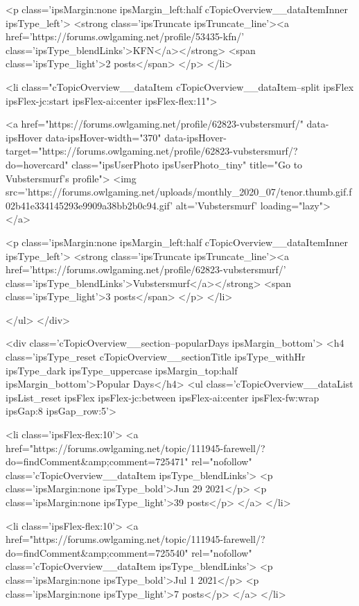 							<p class='ipsMargin:none ipsMargin_left:half cTopicOverview__dataItemInner ipsType_left'>
								<strong class='ipsTruncate ipsTruncate_line'><a href='https://forums.owlgaming.net/profile/53435-kfn/' class='ipsType_blendLinks'>KFN</a></strong>
								<span class='ipsType_light'>2 posts</span>
							</p>
						</li>
					
						<li class="cTopicOverview__dataItem cTopicOverview__dataItem--split ipsFlex ipsFlex-jc:start ipsFlex-ai:center ipsFlex-flex:11">
							


	<a href="https://forums.owlgaming.net/profile/62823-vubstersmurf/" data-ipsHover data-ipsHover-width="370" data-ipsHover-target="https://forums.owlgaming.net/profile/62823-vubstersmurf/?do=hovercard" class="ipsUserPhoto ipsUserPhoto_tiny" title="Go to Vubstersmurf's profile">
		<img src='https://forums.owlgaming.net/uploads/monthly_2020_07/tenor.thumb.gif.f02b41e334145293e9909a38bb2b0c94.gif' alt='Vubstersmurf' loading="lazy">
	</a>

							<p class='ipsMargin:none ipsMargin_left:half cTopicOverview__dataItemInner ipsType_left'>
								<strong class='ipsTruncate ipsTruncate_line'><a href='https://forums.owlgaming.net/profile/62823-vubstersmurf/' class='ipsType_blendLinks'>Vubstersmurf</a></strong>
								<span class='ipsType_light'>3 posts</span>
							</p>
						</li>
					
				</ul>
			</div>
		
		
			<div class='cTopicOverview__section--popularDays ipsMargin_bottom'>
				<h4 class='ipsType_reset cTopicOverview__sectionTitle ipsType_withHr ipsType_dark ipsType_uppercase ipsMargin_top:half ipsMargin_bottom'>Popular Days</h4>
				<ul class='cTopicOverview__dataList ipsList_reset ipsFlex ipsFlex-jc:between ipsFlex-ai:center ipsFlex-fw:wrap ipsGap:8 ipsGap_row:5'>
					
						<li class='ipsFlex-flex:10'>
							<a href="https://forums.owlgaming.net/topic/111945-farewell/?do=findComment&amp;comment=725471" rel="nofollow" class='cTopicOverview__dataItem ipsType_blendLinks'>
								<p class='ipsMargin:none ipsType_bold'>Jun 29 2021</p>
								<p class='ipsMargin:none ipsType_light'>39 posts</p>
							</a>
						</li>
					
						<li class='ipsFlex-flex:10'>
							<a href="https://forums.owlgaming.net/topic/111945-farewell/?do=findComment&amp;comment=725540" rel="nofollow" class='cTopicOverview__dataItem ipsType_blendLinks'>
								<p class='ipsMargin:none ipsType_bold'>Jul 1 2021</p>
								<p class='ipsMargin:none ipsType_light'>7 posts</p>
							</a>
						</li>
					
